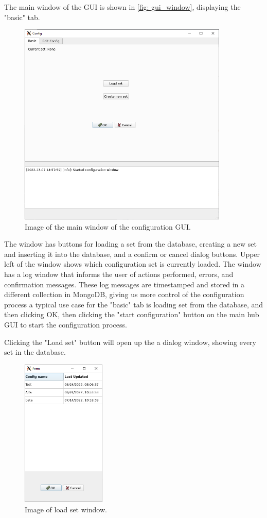 \documentclass[main.tex]{subfiles}
\begin{document}
The main window of the GUI is shown in \autoref{fig: gui_window}, displaying the "basic" tab.

\begin{figure}[!ht]
    \centering
    \includegraphics[width=10cm, scale=1.5]{images/gui_main.png}
    \caption{Image of the main window of the configuration GUI.}
    \label{fig: gui_window}
\end{figure}
\FloatBarrier

The window has buttons for loading a set from the database, creating a new set and inserting it into the database, and a confirm or cancel dialog buttons. Upper left of the window shows which configuration set is currently loaded. The window has a log window that informs the user of actions performed, errors, and confirmation messages. These log messages are timestamped and stored in a different collection in MongoDB, giving us more control of the configuration process a typical use case for the "basic" tab is loading set from the database, and then clicking OK, then clicking the "start configuration" button on the main hub GUI to start the configuration process.

Clicking the "Load set" button will open up the a dialog window, showing every set in the database.

\begin{figure}[!ht]
    \centering
    \includegraphics[width=4cm, scale=1]{images/load_dlg_window.png}
    \caption{Image of load set window.}
    \label{fig: load_window}
\end{figure}
\FloatBarrier
\end{document}

